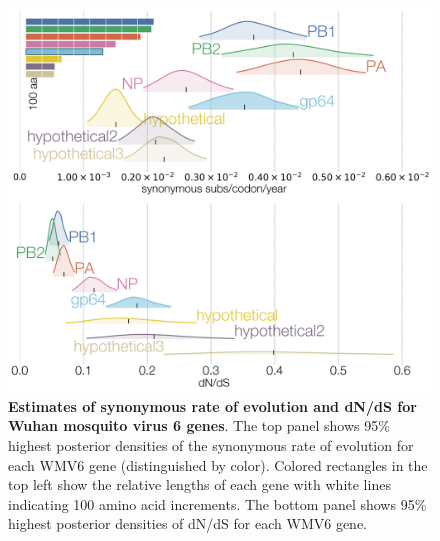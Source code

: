 \documentclass[11pt,twocolumn]{article}
\begin{document}
\begin{figure}
\centering
\includegraphics[width=\textwidth]{SuppFig4_synDNDS.png}
\caption{
\textbf{Estimates of synonymous rate of evolution and dN/dS for Wuhan mosquito virus 6 genes}.
The top panel shows 95\% highest posterior densities of the synonymous rate of evolution for each WMV6 gene (distinguished by color).
Colored rectangles in the top left show the relative lengths of each gene with white lines indicating 100 amino acid increments.
The bottom panel shows 95\% highest posterior densities of dN/dS for each WMV6 gene.
}
\end{figure}
\end{document}
